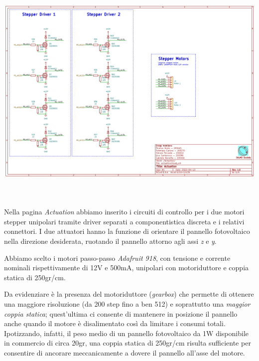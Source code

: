 \begin{center}
\includegraphics[width=6.5in,height=4.48611in]{figures/image41.png}
\captionsetup{type=figure}
\end{center}

Nella pagina \emph{Actuation} abbiamo inserito i circuiti di controllo per 
i due motori stepper unipolari tramite driver separati a
componentistica discreta e i relativi connettori. I due attuatori hanno
la funzione di orientare il pannello fotovoltaico nella direzione
desiderata, ruotando il pannello attorno agli assi \emph{z} e \emph{y}.

Abbiamo scelto i motori passo-passo \emph{Adafruit 918}, con tensione e
corrente nominali rispettivamente di 12V e 500mA, unipolari con
motoriduttore e coppia statica di 250gr/cm.

Da evidenziare è la presenza del motoriduttore (\emph{gearbox}) che
permette di ottenere una maggiore risoluzione (da 200 step fino a ben
512) e soprattutto una \emph{maggior coppia statica}; quest'ultima ci
consente di mantenere in posizione il pannello anche quando il motore è
disalimentato così da limitare i consumi totali. Ipotizzando, infatti,
il peso medio di un pannello fotovoltaico da 1W disponibile in commercio
di circa 20gr, una coppia statica di 250gr/cm risulta sufficiente per
consentire di ancorare meccanicamente a dovere il pannello all'asse del
motore.

